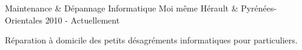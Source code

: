 


\begin{cventries}


\cventry
{Maintenance \& Dépannage Informatique} %
{Moi même} %
{Hérault \& Pyrénées-Orientales} %
{2010 - Actuellement} %
{ %
\begin{cvitems}
\item {Réparation à domicile des petits désagréments informatiques pour particuliers.}
\end{cvitems}
}



\end{cventries}

